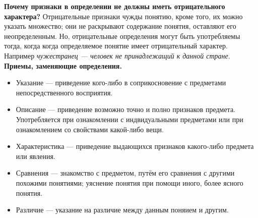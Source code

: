 \documentclass{article}
\begin{document}
\textbf{Почему признаки в определении не должны иметь отрицательного характера?} Отрицательные признаки чужды понятию, кроме того, их можно указать множество; они не раскрывают содержание понятия, оставляют его неопределенным. Но, отрицательные определения могут быть употребляемы тогда, когда когда определяемое понятие имеет отрицательный характер. Например \textit{чужестранец --- человек не принадлежащий к данной стране}.
\\
\textbf{Приемы, заменяющие определения.}
\begin{itemize}
\item Указание --- приведение кого-либо в соприкосновение с предметами непосредственного восприятия.
\item Описание --- приведение возможно точно и полно признаков предмета. Употребляется при ознакомлении с индвидуальными предметами или при ознакомлением со свойствами какой-либо вещи.
\item Характеристика --- приведение выдающихся признаков какого-либо предмета или явления.
\item Сравнения --- знакомство с предметом, путём его сравнения с другими похожими понятиями; уяснение понятия при помощи иного, более ясного понятия.
\item Различие --- указание на различие между данным поняием и другим.
\end{itemize}
\end{document}
